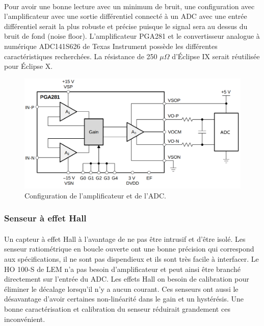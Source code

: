 	\paragraph*{}
	Pour avoir une bonne lecture avec un minimum de bruit, une configuration avec l'amplificateur avec une sortie différentiel connecté à un ADC avec une entrée différentiel serait la plus robuste et précise puisque le signal sera au dessus du bruit de fond (noise floor). L'amplificateur PGA281 et le convertisseur analogue à numérique ADC141S626 de Texas Instrument possède les différentes caractéristiques recherchées. La résistance de 250 $\mu \Omega$ d'Éclipse IX serait réutilisée pour Éclipse X.
	
	\begin{figure}[H]
		\centering
		\includegraphics[scale = 0.4]{Images/current_sense_shunt.png}
		\caption{Configuration de l'amplificateur et de l'ADC.}
		\label{fig:current_sense_shunt}
	\end{figure}
	
	\subsubsection*{Senseur à effet Hall}
	\paragraph*{}	
	Un capteur à effet Hall à l'avantage de ne pas être intrusif et d'être isolé. Les senseur ratiométrique en boucle ouverte ont une bonne précision qui correspond aux spécifications, il ne sont pas dispendieux et ils sont très facile à interfacer. Le HO 100-S de LEM n'a pas besoin d'amplificateur et peut ainsi être branché directement sur l'entrée du ADC. Les effets Hall on besoin de calibration pour éliminer le décalage lorsqu'il n'y a aucun courant. Ces senseurs ont aussi le désavantage d'avoir certaines non-linéarité dans le gain et un hystérésis. Une bonne caractérisation et calibration du senseur réduirait grandement ces inconvénient.
	
